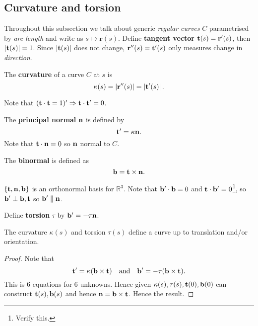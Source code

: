 \subsection{Curvature and torsion}
Throughout this subsection we talk about generic \textit{regular curves} $C$ parametrised by \textit{arc-length} and write as $ s \mapsto \mathbf{r}(s) $. Define \textbf{tangent vector} $ {\bf t}(s)=\mathbf{r}'(s) $, then $ |{\bf t}(s)|=1 $. Since $ |{\bf t}(s)| $ does not change, $ {\bf r}''(s)={\bf t}'(s) $ only measures change in \textit{direction}.

\begin{definition}[Curvature]
    The \textbf{curvature} of a curve $C$ at $s$ is 
    \[
        \kappa(s) = \left| {\bf r}''(s) \right| = \left| {\bf t}'(s) \right|.
    \]
\end{definition}

Note that $ ({\bf t} \cdot {\bf t} =1)' \Rightarrow {\bf t} \cdot {\bf t}'=0 $.
\begin{definition}
    The \textbf{principal normal} ${\bf n}$ is defined by 
    \[
        {\bf t}'=\kappa {\bf n}.
    \]
    Note that $ {\bf t} \cdot {\bf n}=0 $ so ${\bf n}$ normal to $C$.
\end{definition}

\begin{definition}[Binormal]
    The \textbf{binormal} is defined as 
    \[
        {\bf b} = {\bf t} \times {\bf n}.
    \]
\end{definition}

$ \{{\bf t},{\bf n},{\bf b}\} $ is an orthonormal basis for $ \mathbb{R}^{3} $. Note that $ {\bf b}' \cdot {\bf b}=0 $ and $ {\bf t} \cdot {\bf b}'=0 $\footnote{Verify this.}, so $ {\bf b}' \perp {\bf b},{\bf t} $ so $ {\bf b}' \parallel {\bf n} $.

\begin{definition}[Torsion]
    Define \textbf{torsion} $ \tau $ by $ {\bf b}' = -\tau {\bf n} $.
\end{definition}

\begin{proposition}
    The curvature $ \kappa(s) $ and torsion $ \tau(s)$ define a curve up to translation and/or orientation.
\end{proposition}
\begin{proof}
    Note that
    \[
        {\bf t}'=\kappa ({\bf b}\times {\bf t})\quad \text{and}\quad {\bf b}'=-\tau({\bf b}\times {\bf t}).
    \]
    This is 6 equations for 6 unknowns. Hence given $ \kappa(s),\tau(s),{\bf t}(0),{\bf b}(0) $ can construct $ {\bf t}(s),{\bf b}(s) $ and hence ${\bf n}={\bf b}\times {\bf t}$. Hence the result.
\end{proof}

